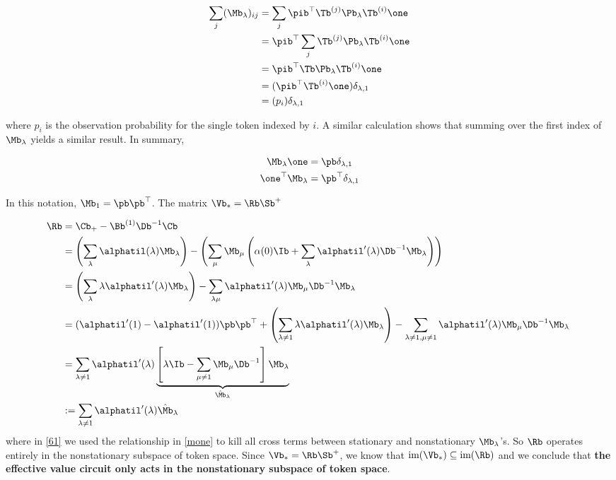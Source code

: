 \documentclass{article}
\begin{document}
\begin{align}
    \sum_j(\Mb_\lambda)_{ij} &= \sum_j \pib^\top \Tb^{(j)}\Pb_\lambda\Tb^{(i)}\one\\
    &= \pib^\top \sum_j \Tb^{(j)}\Pb_\lambda\Tb^{(i)}\one\\
    &=  \pib^\top \Tb\Pb_\lambda\Tb^{(i)}\one \\
    &= (\pib^\top \Tb^{(i)}\one) \delta_{\lambda,1} \\
    &= (p_i) \delta_{\lambda,1}
\end{align}

where $p_i$ is the observation probability for the single token indexed by $i$. A similar calculation shows that summing over the first index of $\Mb_\lambda$ yields a similar result. In summary,

\begin{align}\label{mone}
    \Mb_\lambda \one &= \pb \delta_{\lambda,1} \\
    \one^\top \Mb_\lambda &= \pb^\top \delta_{\lambda,1}
\end{align}

In this notation, $\Mb_1 = \pb \pb^\top$.
The matrix $\Vb_* = \Rb \Sb^{+}$ %

\begin{align}
    \Rb &= \Cb_+ - \Bb^{(1)}\Db^{-1}\Cb \\
    &= \left(\sum_\lambda \alphatil(\lambda) \Mb_\lambda\right) - \left(\sum_\mu \Mb_\mu \left(\alpha(0)\Ib + \sum_\lambda \alphatil'(\lambda)\Db^{-1} \Mb_\lambda\right) \right) \\
    &= \left(\sum_\lambda \lambda\alphatil'(\lambda)\Mb_\lambda\right) - \sum_{\lambda\mu}\alphatil'(\lambda)\Mb_\mu\Db^{-1}\Mb_\lambda\ \\
    &= (\alphatil'(1) - \alphatil'(1))\pb \pb^\top + \left(\sum_{\lambda \neq 1}\lambda\alphatil'(\lambda)\Mb_\lambda\right) - \sum_{\lambda\neq 1, \mu\neq 1}\alphatil'(\lambda)\Mb_\mu\Db^{-1}\Mb_\lambda\ \label{61} \\
    &= \sum_{\lambda \neq 1}\alphatil'(\lambda) \underbrace{\left [ \lambda \Ib - \sum_{\mu\neq 1}\Mb_\mu \Db^{-1}\right]\Mb_\lambda}_{\hat{\Mb}_\lambda} \\
    &:=  \sum_{\lambda \neq 1}\alphatil'(\lambda) \hat{\Mb}_\lambda \label{r}
\end{align}
 where in \eqref{61} we used the relationship in \eqref{mone} to kill all cross terms between stationary and nonstationary $\Mb_\lambda$'s. So $\Rb$ operates entirely in the nonstationary subspace of token space. Since $\Vb_* = \Rb \Sb^+$, we know that $\textrm{im}(\Vb_*) \subseteq \textrm{im}(\Rb)$ and we conclude that \textbf{the effective value circuit only acts in the nonstationary subspace of token space}. 
 
\end{document}
